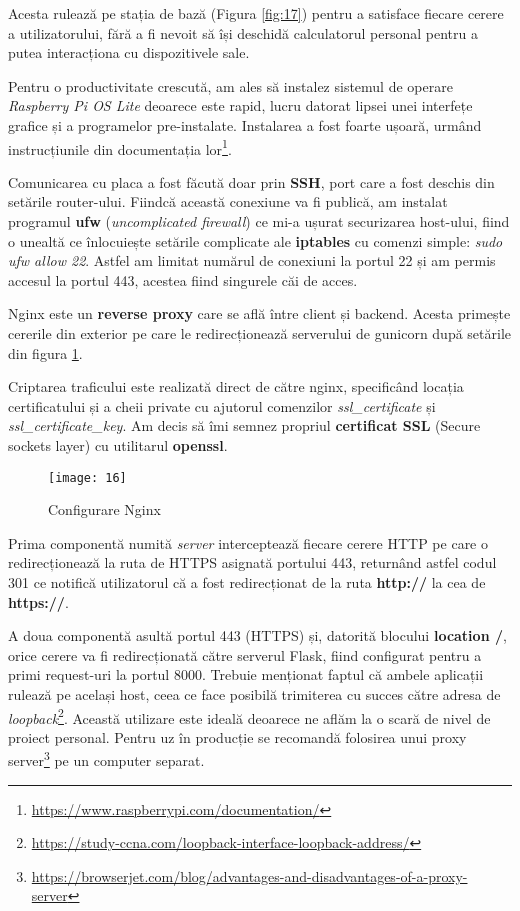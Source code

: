 Acesta rulează pe stația de bază (Figura \ref{fig:17}) pentru a satisface fiecare cerere a utilizatorului, fără a fi nevoit să își deschidă calculatorul personal pentru a putea interacționa cu dispozitivele sale. 

Pentru o productivitate crescută, am ales să instalez sistemul de operare \emph{Raspberry Pi OS Lite} deoarece este rapid, lucru datorat lipsei unei interfețe grafice și a programelor pre-instalate. Instalarea a fost foarte ușoară, urmând instrucțiunile din documentația lor\footnote{\url{https://www.raspberrypi.com/documentation/}}.

Comunicarea cu placa a fost făcută doar prin \textbf{SSH}, port care a fost deschis din setările router-ului. Fiindcă această conexiune va fi publică, am instalat programul \textbf{ufw} (\emph{uncomplicated firewall}) ce mi-a ușurat securizarea host-ului, fiind o unealtă ce înlocuiește setările complicate ale \textbf{iptables} \cite{iptables} cu comenzi simple: \emph{sudo ufw allow 22}. Astfel am limitat numărul de conexiuni la portul 22 și am permis accesul la portul 443, acestea fiind singurele  căi de acces.

Nginx este un \textbf{reverse proxy} \cite{nginx} care se află între client și backend. Acesta primește cererile din exterior pe care le redirecționează serverului de gunicorn după setările din figura \ref{fig:16}.

Criptarea traficului este realizată direct de către nginx, specificând locația certificatului și a cheii private cu ajutorul comenzilor \emph{ssl\_certificate} și \emph{ssl\_certificate\_key}. Am decis să îmi semnez propriul \textbf{certificat SSL} (Secure sockets layer) cu utilitarul \textbf{openssl}.

\begin{figure}[h]
	\centering
	\texttt{[image: 16]}
	\caption{Configurare Nginx}
	\label{fig:16}
\end{figure}

Prima componentă numită \emph{server} interceptează fiecare cerere HTTP pe care o redirecționează la ruta de HTTPS asignată portului 443, returnând astfel codul 301 ce notifică utilizatorul că a fost redirecționat de la ruta \textbf{http://} la cea de \textbf{https://}.

A doua componentă asultă portul 443 (HTTPS) și, datorită blocului \textbf{location /}, orice cerere va fi redirecționată către serverul Flask, fiind configurat pentru a primi request-uri la portul 8000. Trebuie menționat faptul că ambele aplicații rulează pe același host, ceea ce face posibilă trimiterea cu succes către adresa de \emph{loopback}\footnote{\url{https://study-ccna.com/loopback-interface-loopback-address/}}. Această utilizare este ideală deoarece ne aflăm la o scară de nivel de proiect personal. Pentru uz în producție se recomandă folosirea unui proxy server\footnote{\url{https://browserjet.com/blog/advantages-and-disadvantages-of-a-proxy-server}} pe un computer separat.


